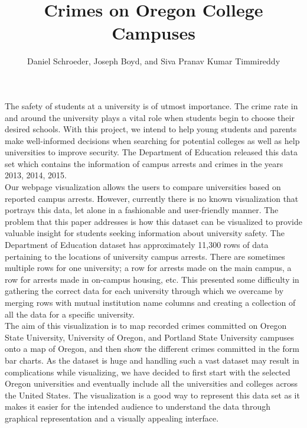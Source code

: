 \documentclass[journal]{vgtc}                %
\title{Crimes on Oregon College Campuses}
\author{Daniel Schroeder, Joseph Boyd, and Siva Pranav Kumar Timmireddy}
\begin{document}


\maketitle

The safety of students at a university is of utmost importance. The crime rate in and around the university plays a vital role when students begin to choose their desired schools. With this project, we intend to help young students and parents make well-informed decisions when searching for potential colleges as well as help universities to improve security. The Department of Education released this data set which contains the information of campus arrests and crimes in the years 2013, 2014, 2015.\\
\indent Our webpage visualization allows the users to compare universities based on reported campus arrests. However, currently there is no known visualization that portrays this data, let alone in a fashionable and user-friendly manner. The problem that this paper addresses is how this dataset can be visualized to provide valuable insight for students seeking information about university safety. The Department of Education dataset has approximately 11,300 rows of data pertaining to the locations of university campus arrests. There are sometimes multiple rows for one university; a row for arrests made on the main campus, a row for arrests made in on-campus housing, etc. This presented some difficulty in gathering the correct data for each university through which we overcame by merging rows with mutual institution name columns and creating a collection of all the data for a specific university.\\
\indent The aim of this visualization is to map recorded crimes committed on Oregon State University, University of Oregon, and Portland State University campuses onto a map of Oregon, and then show the different crimes committed in the form bar charts. As the dataset is huge and handling such a vast dataset may result in complications while visualizing, we have decided to first start with the selected Oregon universities and eventually include all the universities and colleges across the United States. The visualization is a good way to represent this data set as it makes it easier for the intended audience to understand the data through graphical representation and a visually appealing interface.\\ \\
\end{document}
